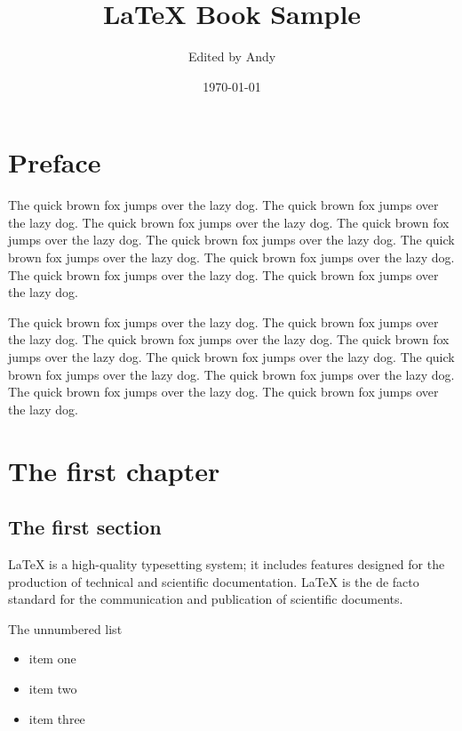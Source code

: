 \documentclass[openany,twoside,12pt]{book}
\title{\bfseries LaTeX Book Sample}
\author{Edited by Andy}
\date{\today}
\theoremstyle{plain}
\numberwithin{equation}{chapter}
\numberwithin{figure}{chapter}
\numberwithin{table}{chapter}
\begin{document}
\maketitle

\thispagestyle{empty}

\frontmatter


\chapter{Preface}

The quick brown fox jumps over the lazy dog. The quick brown fox jumps over the lazy dog. The quick brown fox jumps over the lazy dog. The quick brown fox jumps over the lazy dog. The quick brown fox jumps over the lazy dog. The quick brown fox jumps over the lazy dog. The quick brown fox jumps over the lazy dog. The quick brown fox jumps over the lazy dog. The quick brown fox jumps over the lazy dog.


The quick brown fox jumps over the lazy dog. The quick brown fox jumps over the lazy dog. The quick brown fox jumps over the lazy dog. The quick brown fox jumps over the lazy dog. The quick brown fox jumps over the lazy dog. The quick brown fox jumps over the lazy dog. The quick brown fox jumps over the lazy dog. The quick brown fox jumps over the lazy dog. The quick brown fox jumps over the lazy dog.



\cleardoublepage
{}
{}
\tableofcontents


\mainmatter



\chapter{The first chapter}

\section{The first section}\label{my label}
LaTeX is a high-quality typesetting system; it includes features designed for the production of technical and scientific documentation. LaTeX is the de facto standard for the communication and publication of scientific documents.

The unnumbered list
\begin{itemize}
  \item item one
  \item item two
  \item item three
\end{itemize}
\end{document}
